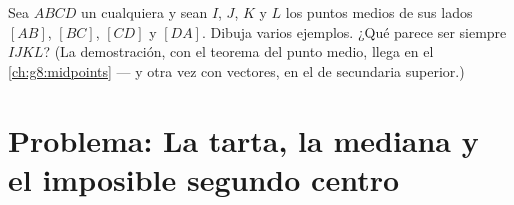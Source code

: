 \begin{exercise}[$\star\star\star$]\label{exo:g7:central:11}
Sea $ABCD$ un  cualquiera y sean $I$, $J$, $K$ y $L$ los puntos medios
de sus lados $[AB]$, $[BC]$, $[CD]$ y $[DA]$. Dibuja varios ejemplos.
¿Qué parece ser siempre $IJKL$? (La demostración, con el teorema
del punto medio, llega en el \cref{ch:g8:midpoints} --- y otra vez con vectores,
en el  de secundaria superior.)
\end{exercise}

\section{Problema: La tarta, la mediana y el imposible segundo
centro}

